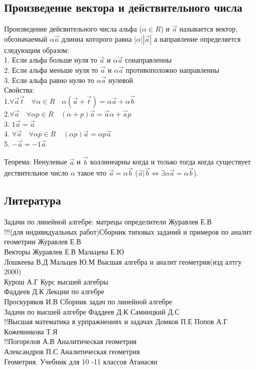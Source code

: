 \documentclass[a4paper, 12pt]{article}
\begin{document}
\subsection{Произведение вектора и действительного числа}
Произведение дейсвительного числа альфа ($ \alpha \in R $) и $ \vec{a} $ называется вектор, обозначаемый $ \alpha\vec{a} $ длинна которого равна $ |\alpha||\vec{a}| $ а направление определяется следующим образом:\\
1. Если альфа больше нуля то $ \vec{a} $ и $ \alpha\vec{a} $ сонаправленны\\
2. Если альфа меньше нуля то $ \vec{a} $ и $ \alpha\vec{a} $ противоположно направленны\\
3. Если альфа равно нулю то  $ \alpha\vec{a} $ нулевой\\
Свойства:\\
1.$\forall \vec{a}\vec{t} \quad\forall \alpha \in R \quad\alpha(\vec{a}+ \vec{t}) = \alpha \vec{a} + \alpha \vec{b}$\\
2.$  \forall \vec{a} \quad\forall \alpha p\in R  \quad(\alpha + p)\vec{a} = \vec{a} \alpha + \vec{a}p$\\
3. $  1 \vec{a} = \vec{a} $\\
4. $  \forall \vec{a} \quad\forall \alpha p \in R  \quad(\alpha p)\vec{a}= \alpha p\vec{a}$\\
5. $  -\vec{a} = -1\vec{a} $\\
\begin{mdframed}[backgroundcolor=blue!20] 
       Теорема: Ненулевые $ \vec{a} $ и $ \vec{b} $ коллинеарны когда и только тогда когда существует дествительное число $ \alpha $ такое что $ \vec{a} = \alpha\vec{b} $ ($\vec{a}|\vec{b} \Leftrightarrow \exists \alpha \vec{a} = \alpha\vec{b}$).
    \end{mdframed}


\subsection*{Литература}
Задачи по линейной алгебре: матрецы определители Журавлев Е.В\\
!!!(для индивидуальных работ)Сборник типовых заданий и примеров по аналит геометрии Журавлев Е.В\\
Векторы Журавлев Е.В Мальцева Е.Ю\\
Лошкеева В.Д Мальцев Ю.М Высшая алгебра и аналит геометрия(изд алтгу 2000)\\
Курош А.Г Курс высшей алгебры\\
Фаддеев Д.К Лекции по алгебре\\
Проскуряков И.В Сборник задач по линейной алгебре\\
Задачи по высшей алгебре Фаддеев Д.К Саминцкий Д.С\\
!!Высшая математика в урпражнениях и задачах Домков П.Е Попов А.Г Кожевникова Т.Я\\
!!Погорелов А.В Аналитическая геометрия\\
Александров П.С Аналитическая геометрия\\
Геометрия. Учебник для 10 -11 классов Атанасян\\
\end{document}
